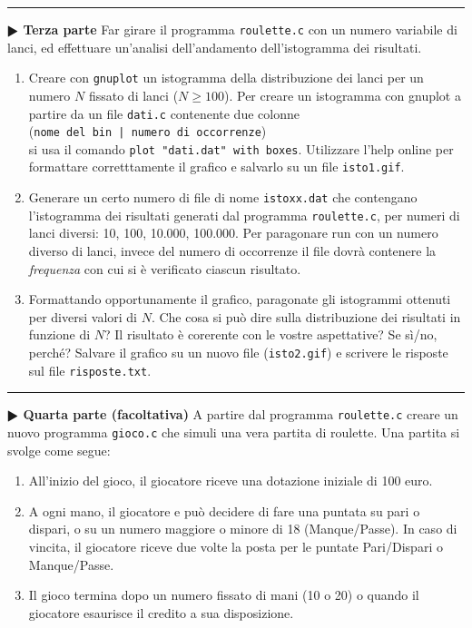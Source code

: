 \documentclass[11pt]{article}
\begin{document}
\hrule
\vspace{2mm}
\textbf{$\RHD$ Terza parte}
Far girare il programma \texttt{roulette.c} con un numero variabile di lanci,
ed effettuare un'analisi dell'andamento dell'istogramma dei risultati.
\begin{enumerate}
\item Creare con \texttt{gnuplot} un istogramma della distribuzione dei lanci per un numero $N$ fissato di lanci ($N \ge 100$). Per creare un istogramma con gnuplot a partire da un file \texttt{dati.c} contenente due colonne 
\\
(\texttt{nome del bin  |   numero di occorrenze}) 
\\
si usa il comando \texttt{plot "dati.dat" with boxes}. Utilizzare l'help online per formattare corretttamente il grafico e salvarlo su un file \texttt{isto1.gif}.
\item Generare un certo numero di file di nome \texttt{istoxx.dat} che contengano l'istogramma dei risultati generati dal programma \texttt{roulette.c}, per numeri di lanci diversi: 10, 100, 10.000, 100.000.
 Per paragonare run con un numero diverso di lanci, invece del numero di occorrenze il file dovr\`a contenere
la {\em frequenza} con cui si \`e verificato ciascun risultato.
\item Formattando opportunamente il grafico, paragonate gli istogrammi ottenuti per diversi valori di $N$. Che cosa si 
pu\`o dire sulla distribuzione dei risultati in funzione di $N$? Il risultato \`e corerente con le vostre aspettative? Se s\`i/no, perch\'e? Salvare il grafico su un nuovo file (\texttt{isto2.gif}) e scrivere le risposte sul file \texttt{risposte.txt}.
\end{enumerate}


\hrule
\vspace{2mm}
\textbf{$\RHD$ Quarta parte (facoltativa)}
A partire dal programma \texttt{roulette.c} creare un nuovo programma \texttt{gioco.c} che simuli una vera
partita di roulette. 
Una partita si svolge come segue:
\begin{enumerate}
\item All'inizio del gioco, il giocatore riceve una dotazione iniziale di 100 euro.
\item A ogni mano, il giocatore e pu\`o decidere di fare una puntata  su pari o dispari, o su un numero maggiore o minore di 18 (Manque/Passe). In caso di vincita, il giocatore riceve due volte la posta per le puntate Pari/Dispari o Manque/Passe.
\item Il gioco termina dopo un numero fissato di mani (10 o 20) o quando il giocatore esaurisce il credito a sua disposizione.
\end{enumerate}
\end{document}
